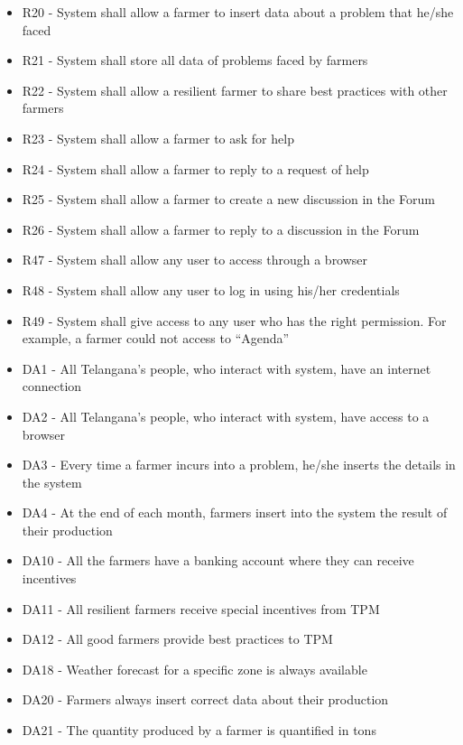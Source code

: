 \begin{enumerate}[label=\textbf{G.\arabic*}]
\begin{enumerate} [label=\textbf{G.4.\arabic*}]
\begin{itemize} [label =]
            \item R20 - System shall allow a farmer to insert data about a problem that he/she faced 
            \item R21 - System shall store all data of problems faced by farmers
            \item R22 - System shall allow a resilient farmer to share best practices with other farmers
            \item R23 - System shall allow a farmer to ask for help
            \item R24 - System shall allow a farmer to reply to a request of help
            \item R25 - System shall allow a farmer to create a new discussion in the Forum
            \item R26 - System shall allow a farmer to reply to a discussion in the Forum
            \item R47 - System shall allow any user to access through a browser
            \item R48 - System shall allow any user to log in using his/her credentials
            \item R49 - System shall give access to any user who has the right permission. For example, a farmer could not access to “Agenda”
            \item DA1 - All Telangana’s people, who interact with system, have an internet connection
            \item DA2 - All Telangana’s people, who interact with system, have access to a browser
            \item DA3 - Every time a farmer incurs into a problem, he/she inserts the details in the system
            \item DA4 - At the end of each month, farmers insert into the system the result of their production
            \item DA10 - All the farmers have a banking account where they can receive incentives
            \item DA11 - All resilient farmers receive special incentives from TPM
            \item DA12 - All good farmers provide best practices to TPM
            \item DA18 - Weather forecast for a specific zone is always available
            \item DA20 - Farmers always insert correct data about their production
            \item DA21 - The quantity produced by a farmer is quantified in tons

\end{itemize}
\end{enumerate}
\end{enumerate}
